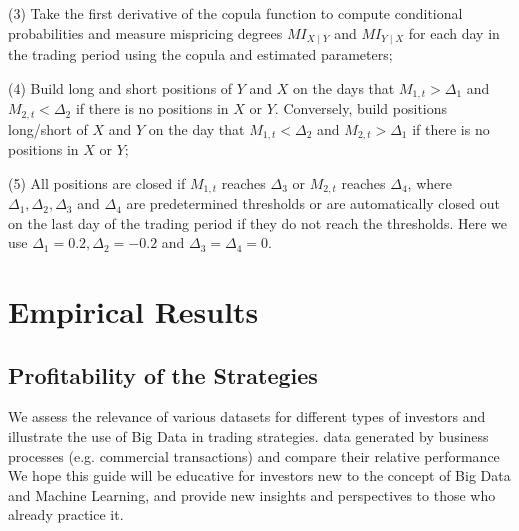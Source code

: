 \documentclass[a4paper]{article}
\begin{document}
	\vspace{0.3cm}
	\vspace{0.3cm}
	
	(3) Take the first derivative of the copula function to compute conditional
		probabilities and measure mispricing degrees $MI_{X\mid Y}$ and $MI_{Y\mid X}$ for each day in the trading period using the copula and estimated parameters;
		
	\vspace{0.3cm}
	\vspace{0.3cm}
		
	(4) Build long and short positions of $Y$ and $X$ on the days that $M_{1,t}>\Delta_{1}$ and $M_{2,t}<\Delta_{2}$ if there is no positions in $X$ or $Y$. Conversely, build positions long/short of $X$ and $Y$ on the day that $M_{1,t}<\Delta_{2}$ and $M_{2,t}>\Delta_{1}$ if there is no positions in $X$ or $Y$;
	
	\vspace{0.3cm}
	\vspace{0.3cm}
		
	(5) All positions are closed if $M_{1,t}$ reaches $\Delta_{3}$ or $M_{2,t}$ reaches $\Delta_{4}$, where $\Delta_{1},\Delta_{2},\Delta_{3}$ and $\Delta_{4}$ are predetermined thresholds or are automatically closed out on the last day of the trading period if they do not reach the thresholds. Here we use $\Delta_{1}=0.2, \Delta_{2}=-0.2$ and $\Delta_{3}=\Delta_{4}=0$.
	
	
	\vspace{0.6cm}
	
	\section{Empirical Results}
	
	\vspace{0.3cm}
	
	\subsection{Profitability of the Strategies}
	
	We assess the relevance of
various datasets for different types of investors and illustrate the use of Big Data in trading strategies. data generated by business processes (e.g. commercial
transactions)  and compare their relative performance We hope this guide will be educative for investors new to the concept of Big Data and Machine Learning, and provide new
insights and perspectives to those who already practice it.
\end{document}
